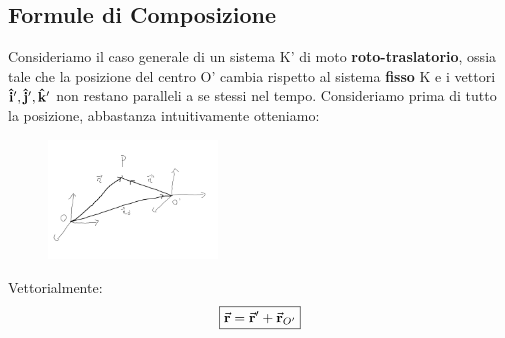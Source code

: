 \documentclass{report}
\renewcommand{\i}{\vu{i}}
\renewcommand{\j}{\vu{j}}
\renewcommand{\k}{\vu{k}}
\renewcommand{\r}{\va{r}}
\begin{document}
\subsection{Formule di Composizione}
Consideriamo il caso generale di un sistema K' di moto \textbf{roto-traslatorio}, ossia tale che la posizione del centro O' cambia rispetto al sistema \textbf{fisso} K e i vettori $\i',\j',\k'$ non restano paralleli a se stessi nel tempo. Consideriamo prima di tutto la posizione, abbastanza intuitivamente otteniamo:
\begin{figure}[H]
    \centering
    \includegraphics[width=0.4\textwidth]{PosizioneRelativa.png}
\end{figure}
Vettorialmente:
\begin{equation}
    \boxed{\r=\r'+\r_{O'}}
\end{equation}
\end{document}
